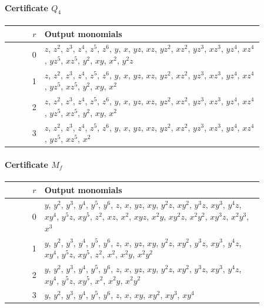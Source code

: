 \documentclass[11pt]{amsart}
\theoremstyle{definition}
\theoremstyle{remark}
\numberwithin{equation}{section}
\begin{document}
\paragraph*{Certificate $Q_4$}
\begin{center}
\begin{tabular}{rp{0.86\linewidth}}
$r$ & Output monomials\\\hline
0 & \(z\), \(z^{2}\), \(z^{3}\), \(z^{4}\), \(z^{5}\), \(z^{6}\), \(y\), \(x\), \(yz\), \(xz\), \(yz^{2}\), \(xz^{2}\), \(yz^{3}\), \(xz^{3}\), \(yz^{4}\), \(xz^{4}\), \(yz^{5}\), \(xz^{5}\), \(y^{2}\), \(xy\), \(x^{2}\), \(y^{2}z\)\\
1 & \(z\), \(z^{2}\), \(z^{3}\), \(z^{4}\), \(z^{5}\), \(z^{6}\), \(y\), \(x\), \(yz\), \(xz\), \(yz^{2}\), \(xz^{2}\), \(yz^{3}\), \(xz^{3}\), \(yz^{4}\), \(xz^{4}\), \(yz^{5}\), \(xz^{5}\), \(y^{2}\), \(xy\), \(x^{2}\)\\
2 & \(z\), \(z^{2}\), \(z^{3}\), \(z^{4}\), \(z^{5}\), \(z^{6}\), \(y\), \(x\), \(yz\), \(xz\), \(yz^{2}\), \(xz^{2}\), \(yz^{3}\), \(xz^{3}\), \(yz^{4}\), \(xz^{4}\), \(yz^{5}\), \(xz^{5}\), \(y^{2}\), \(xy\), \(x^{2}\)\\
3 & \(z\), \(z^{2}\), \(z^{3}\), \(z^{4}\), \(z^{5}\), \(z^{6}\), \(y\), \(x\), \(yz\), \(xz\), \(yz^{2}\), \(xz^{2}\), \(yz^{3}\), \(xz^{3}\), \(yz^{4}\), \(xz^{4}\), \(yz^{5}\), \(xz^{5}\), \(x^{2}\)\\
\end{tabular}
\end{center}

\paragraph*{Certificate $M_f$}
\begin{center}
\begin{tabular}{rp{0.86\linewidth}}
$r$ & Output monomials\\\hline
0 & \(y\), \(y^{2}\), \(y^{3}\), \(y^{4}\), \(y^{5}\), \(y^{6}\), \(z\), \(x\), \(yz\), \(xy\), \(y^{2}z\), \(xy^{2}\), \(y^{3}z\), \(xy^{3}\), \(y^{4}z\), \(xy^{4}\), \(y^{5}z\), \(xy^{5}\), \(z^{2}\), \(xz\), \(x^{2}\), \(xyz\), \(x^{2}y\), \(xy^{2}z\), \(x^{2}y^{2}\), \(xy^{3}z\), \(x^{2}y^{3}\), \(x^{3}\)\\
1 & \(y\), \(y^{2}\), \(y^{3}\), \(y^{4}\), \(y^{5}\), \(y^{6}\), \(z\), \(x\), \(yz\), \(xy\), \(y^{2}z\), \(xy^{2}\), \(y^{3}z\), \(xy^{3}\), \(y^{4}z\), \(xy^{4}\), \(y^{5}z\), \(xy^{5}\), \(z^{2}\), \(x^{2}\), \(x^{2}y\), \(x^{2}y^{2}\)\\
2 & \(y\), \(y^{2}\), \(y^{3}\), \(y^{4}\), \(y^{5}\), \(y^{6}\), \(z\), \(x\), \(yz\), \(xy\), \(y^{2}z\), \(xy^{2}\), \(y^{3}z\), \(xy^{3}\), \(y^{4}z\), \(xy^{4}\), \(y^{5}z\), \(xy^{5}\), \(x^{2}\), \(x^{2}y\), \(x^{2}y^{2}\)\\
3 & \(y\), \(y^{2}\), \(y^{3}\), \(y^{4}\), \(y^{5}\), \(y^{6}\), \(z\), \(x\), \(xy\), \(xy^{2}\), \(xy^{3}\), \(xy^{4}\)\\
\end{tabular}
\end{center}
\end{document}
